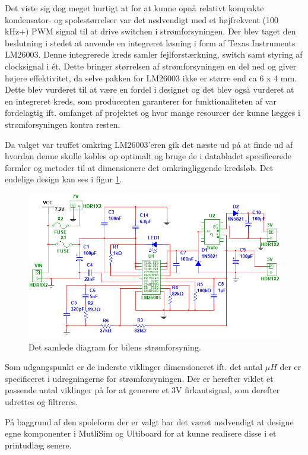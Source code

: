 Det viste sig dog meget hurtigt at for at kunne opnå relativt kompakte kondensator- og spolestørrelser var det nødvendigt med et højfrekvent (100 kHz+) PWM signal til at drive switchen i strømforsyningen.
Der blev taget den beslutning i stedet at anvende en integreret løsning i form af Texas Instruments LM26003\cite{lib:lm26003}. 
Denne integrerede kreds samler fejlforstærkning, switch samt styring af clocksignal i ét.
Dette bringer størrelsen af strømforsyningen en del ned og giver højere effektivitet, da selve pakken for LM26003 ikke er større end ca 6 x 4 mm.
Dette blev vurderet til at være en fordel i designet og det blev også vurderet at en integreret kreds, som producenten garanterer for funktionaliteten af var fordelagtig ift. omfanget af projektet og hvor mange resourcer der kunne lægges i strømforsyningen kontra resten.

Da valget var truffet omkring LM26003'eren gik det næste ud på at finde ud af hvordan denne skulle kobles op optimalt og bruge de i databladet specificerede formler og metoder til at dimensionere det omkringliggende kredsløb.
Det endelige design kan ses i figur \ref{fig:bil_psu}.

\begin{figure}[h]
\centering
\includegraphics[width=\textwidth]{../fig/diagrammer/bil/psu_kredsloeb}
\caption{Det samlede diagram for bilens strømforsyning.}
\label{fig:bil_psu}
\end{figure}

Som udgangspunkt er de inderste viklinger dimensioneret ift. det antal $\mu H$ der er specificeret i udregningerne\cite{lib:psu_calcs} for strømforsyningen.
Der er herefter viklet et passende antal viklinger på for at generere et 3V firkantsignal, som derefter udrettes og filtreres.

På baggrund af den spoleform der er valgt har det været nødvendigt at designe egne komponenter i MutliSim og Ultiboard for at kunne realisere disse i et printudlæg senere.
